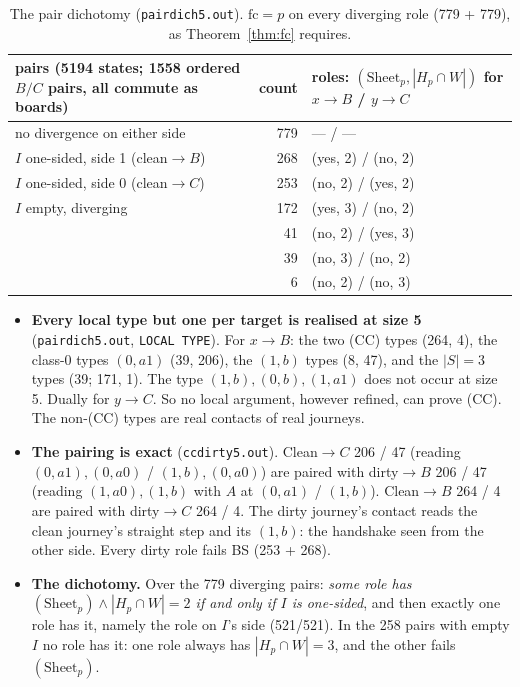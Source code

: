 \documentclass[11pt]{article}
\theoremstyle{definition}\newtheorem{definition}[theorem]{Definition}\newtheorem{remark}[theorem]{Remark}
\begin{document}
\begin{table}[h]\centering\small
\begin{tabular}{lrl}\toprule
pairs (5194 states; 1558 ordered $B/C$ pairs, all commute as boards) & count & roles: $(\mathrm{Sheet}_p,|H_p\cap W|)$ for $x{\to}B$ / $y{\to}C$\\\midrule
no divergence on either side & 779 & --- / ---\\
$I$ one-sided, side 1 (clean$\to B$) & 268 & (yes, 2) / (no, 2)\\
$I$ one-sided, side 0 (clean$\to C$) & 253 & (no, 2) / (yes, 2)\\
$I$ empty, diverging & 172 & (yes, 3) / (no, 2)\\
 & 41 & (no, 2) / (yes, 3)\\
 & 39 & (no, 3) / (no, 2)\\
 & 6 & (no, 2) / (no, 3)\\\bottomrule
\end{tabular}
\caption{The pair dichotomy (\texttt{pairdich5.out}). $\mathrm{fc}=p$ on every diverging role (779 + 779), as Theorem~\ref{thm:fc} requires.}\label{tab:pair}
\end{table}

\begin{itemize}
\item \textbf{Every local type but one per target is realised at size 5} (\texttt{pairdich5.out}, \texttt{LOCAL TYPE}). For $x\to B$: the two (CC) types (264, 4), the class-0 types $(0,a1)$ (39, 206), the $(1,b)$ types (8, 47), and the $|S|=3$ types (39; 171, 1). The type $(1,b),(0,b),(1,a1)$ does not occur at size 5. Dually for $y\to C$. So no local argument, however refined, can prove (CC). The non-(CC) types are real contacts of real journeys.
\item \textbf{The pairing is exact} (\texttt{ccdirty5.out}). Clean$\to C$ 206 / 47 (reading $(0,a1),(0,a0)$ / $(1,b),(0,a0)$) are paired with dirty$\to B$ 206 / 47 (reading $(1,a0),(1,b)$ with $A$ at $(0,a1)$ / $(1,b)$). Clean$\to B$ 264 / 4 are paired with dirty$\to C$ 264 / 4. The dirty journey's contact reads the clean journey's straight step and its $(1,b)$: the handshake seen from the other side. Every dirty role fails BS (253 + 268).
\item \textbf{The dichotomy.} Over the 779 diverging pairs: \emph{some role has $(\mathrm{Sheet}_p)\wedge|H_p\cap W|=2$ if and only if $I$ is one-sided}, and then exactly one role has it, namely the role on $I$'s side (521/521). In the 258 pairs with empty $I$ no role has it: one role always has $|H_p\cap W|=3$, and the other fails $(\mathrm{Sheet}_p)$.
\end{itemize}
\end{document}
